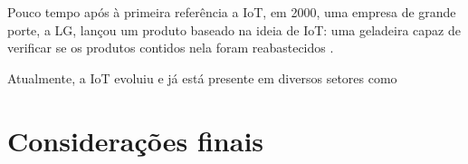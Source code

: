 \documentclass[
	article,			%
	11pt,				%
	oneside,			%
	a4paper,			%
	section=TITLE,		%
	subsection=TITLE,	%
	english,			%
	brazil,				%
	sumario=tradicional
	]{abntex2}
\begin{document}
Pouco tempo após à primeira referência a IoT, em 2000, uma empresa de grande porte, a LG, lançou 
um produto baseado na ideia de IoT: uma geladeira capaz de verificar se os produtos contidos nela 
foram reabastecidos \cite{survey-suresh}.



Atualmente, a IoT evoluiu e já está presente em diversos setores como 





% 

\section*{Considerações finais}







\end{document}
